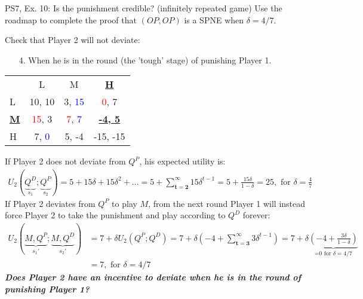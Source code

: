 \begin{frame}{PS7, Ex. 10: Is the punishment credible? (infinitely repeated game)}
    Use the roadmap to complete the proof that $(OP,OP)$ is a SPNE when $\delta=4/7$.\vspace{-4pt}
    \begin{multicols}{2}
      Check that Player 2 will not deviate:
      \begin{itemize}
        \item[4.] When he is in the  round (the 'tough' stage) of punishing Player 1.
      \end{itemize}
      \vfill\null\columnbreak
      \vspace{-6pt}
      \begin{table}
        \begin{tabular}{l|c|c|c|}
          \multicolumn{1}{c}{} & \multicolumn{1}{c}{L} & \multicolumn{1}{c}{M} & \multicolumn{1}{c}{\textbf{\underline{H}}} \\\cline{2-4}
          L & 10, 10 & 3, \textcolor{blue}{15} & \textcolor{red}{0}, 7 \\\cline{2-4}
          \textbf{\underline{M}} & \textcolor{red}{15}, 3 & \textcolor{red}{7}, \textcolor{blue}{7} & \textbf{\underline{-4, 5}} \\\cline{2-4}
          H & 7, \textcolor{blue}{0} & 5, -4 & -15, -15 \\\cline{2-4}
        \end{tabular}
      \end{table}
    \end{multicols}
    \vspace{-20pt}
    If Player 2 does not deviate from $Q^P$, his expected utility is:
    \vspace{-6pt}
    \begin{align*}
      U_2(\underbrace{Q^D}_{s_1};\underbrace{Q^P}_{s_2})=5+15\delta+15\delta^2+...
                  =5+\sum_{\bm{t=2}}^\infty15\delta^{t-1}
                  =5+\frac{15\delta}{1-\delta}
                  =25,\text{ for }\delta=\frac{4}{7}
    \end{align*}
    If Player 2 deviates from $Q^P$ to play $M$, from the next round Player 1 will instead force Player 2 to take the punishment and play according to $Q^D$ forever:
    \begin{align*}
      U_2(\underbrace{M,Q^P}_{s_1'};\underbrace{M,Q^D}_{s_2'})&=7+\delta U_2(Q^P;Q^D)
                      =7+\delta\left(-4+\sum_{\bm{t=3}}^\infty3\delta^{t-1}\right)
                      =7+\delta\underbrace{\left(-4+\frac{3\delta}{1-\delta}\right)}_\text{=0 for $\delta=4/7$}\\
                      &=7,\text{ for }\delta=4/7
    \end{align*}
    \textbf{\textit{Does Player 2 have an incentive to deviate when he is in the  round of punishing Player 1?}}
    \vfill\null
\end{frame}
